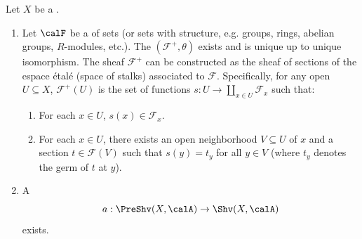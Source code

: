 \begin{theorem} \label{theorem:sheafification_for_sheaves_of_sets_on_a_topological_space_exist}
    Let $X$ be a . 
    \begin{enumerate}
        \item Let $\calF$ be a  of sets (or sets with structure, e.g. groups, rings, abelian groups, $R$-modules, etc.). The  $(\mathcal{F}^+, \theta)$ exists and is unique up to unique isomorphism. The sheaf $\mathcal{F}^+$ can be constructed as the sheaf of sections of the espace étalé (space of stalks) associated to $\mathcal{F}$. Specifically, for any open $U \subseteq X$, $\mathcal{F}^+(U)$ is the set of functions $s: U \to \coprod_{x \in U} \mathcal{F}_x$ such that:
        \begin{enumerate}
            \item For each $x \in U$, $s(x) \in \mathcal{F}_x$.
            \item For each $x \in U$, there exists an open neighborhood $V \subseteq U$ of $x$ and a section $t \in \mathcal{F}(V)$ such that $s(y) = t_y$ for all $y \in V$ (where $t_y$ denotes the germ of $t$ at $y$).
        \end{enumerate}

    \item A  
    $$a: \PreShv(X, \calA) \to \Shv(X, \calA) $$
    exists.
    \end{enumerate}

\end{theorem}